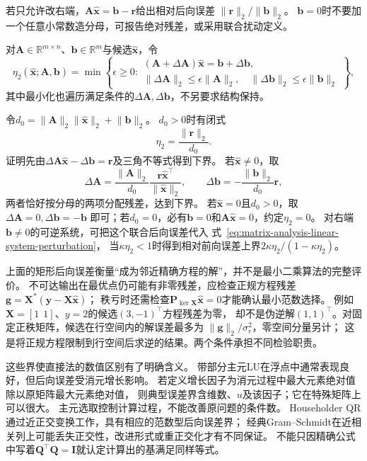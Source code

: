 若只允许改右端，$\bm A\widehat{\bm x}=\bm b-\bm r$给出相对后向误差
$\lVert\bm r\rVert_2/\lVert\bm b\rVert_2$。
$\bm b=0$时不要加一个任意小常数造分母，可报告绝对残差，或采用联合扰动定义。
\begin{definition}[线性系统的范数型相对后向误差]
\label{def:matrix-analysis-normwise-backward-error}
对$\bm A\in\mathbb R^{m\times n}$、$\bm b\in\mathbb R^m$与候选$\widehat{\bm x}$，令
\[
 \eta_2(\widehat{\bm x};\bm A,\bm b)
 =\min\left\{\epsilon\geq0:
 \begin{array}{l}
  (\bm A+\Delta\bm A)\widehat{\bm x}=\bm b+\Delta\bm b,\\
  \lVert\Delta\bm A\rVert_2\leq\epsilon\lVert\bm A\rVert_2,\quad
  \lVert\Delta\bm b\rVert_2\leq\epsilon\lVert\bm b\rVert_2
 \end{array}\right\},
\]
其中最小化也遍历满足条件的$\Delta\bm A,\Delta\bm b$，不另要求结构保持。
\end{definition}
令$d_0=\lVert\bm A\rVert_2\lVert\widehat{\bm x}\rVert_2+\lVert\bm b\rVert_2$。
$d_0>0$时有闭式
\[
 \eta_2=\frac{\lVert\bm r\rVert_2}{d_0}.
\]
证明先由$\Delta\bm A\widehat{\bm x}-\Delta\bm b=\bm r$及三角不等式得到下界。
若$\widehat{\bm x}\neq0$，取
\[
 \Delta\bm A=
 \frac{\lVert\bm A\rVert_2}{d_0}
 \frac{\bm r\widehat{\bm x}^\top}{\lVert\widehat{\bm x}\rVert_2},
 \qquad
 \Delta\bm b=-\frac{\lVert\bm b\rVert_2}{d_0}\bm r,
\]
两者恰好按分母的两项分配残差，达到下界。
若$\widehat{\bm x}=0$且$d_0>0$，取$\Delta\bm A=0,\Delta\bm b=-\bm b$
即可；若$d_0=0$，必有$\bm b=0$和$\bm A\widehat{\bm x}=0$，约定$\eta_2=0$。
对右端$\bm b\neq0$的可逆系统，可把这个联合后向误差代入
式~\eqref{eq:matrix-analysis-linear-system-perturbation}，
当$\kappa\eta_2<1$时得到相对前向误差上界$2\kappa\eta_2/(1-\kappa\eta_2)$。

上面的矩形后向误差衡量“成为邻近精确方程的解”，并不是最小二乘算法的完整评价。
不可达输出在最优点仍可能有非零残差，应检查正规方程残差
$\bm g=\bm X^*(\bm y-\bm X\widehat{\bm x})$；
秩亏时还需检查$\bm P_{\ker\bm X}\widehat{\bm x}=0$才能确认最小范数选择。
例如$\bm X=[1\ \ 1]$、$y=2$的候选$(3,-1)^\top$方程残差为零，
却不是伪逆解$(1,1)^\top$。对固定正秩矩阵，候选在行空间内的解误差最多为
$\lVert\bm g\rVert_2/\sigma_r^2$，零空间分量另计；
这是将正规方程限制到行空间后求逆的结果。两个条件承担不同检验职责。

这些界使直接法的数值区别有了明确含义。
带部分主元LU在浮点中通常表现良好，但后向误差受消元增长影响。
若定义增长因子为消元过程中最大元素绝对值除以原矩阵最大元素绝对值，
则典型误差界含维数、$u$及该因子；它在特殊矩阵上可以很大。
主元选取控制计算过程，不能改善原问题的条件数。
Householder QR通过近正交变换工作，具有相应的范数型后向误差界；
经典Gram--Schmidt在近相关列上可能丢失正交性，改进形式或重正交化才有不同保证。
不能只因精确公式中写着$\bm Q^\top\bm Q=\bm I$就认定计算出的基满足同样等式。

